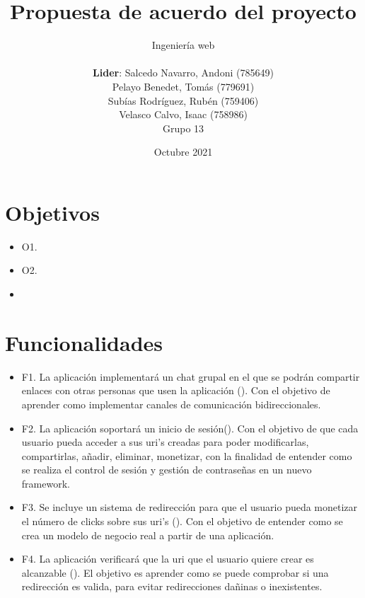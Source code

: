 \documentclass{article}
\title{Propuesta de acuerdo del proyecto}
\author{Ingeniería web\\\\\textbf{Lider}: Salcedo Navarro, Andoni (785649)\\Pelayo Benedet, Tomás (779691)\\Subías Rodríguez, Rubén (759406)\\Velasco Calvo, Isaac (758986)\\Grupo 13}
\date{Octubre 2021}
\begin{document}
 
\maketitle
 
\pagebreak
 
\section*{Objetivos}


\begin{itemize}
    \item O1.
    \item O2.
    \item 
\end{itemize}

\section*{Funcionalidades}



\begin{itemize}
    \item F1. La aplicación implementará un chat grupal en el que se podrán compartir enlaces con otras personas que usen la aplicación (). Con el objetivo de aprender como implementar canales de comunicación bidireccionales.
    \item F2. La aplicación soportará un inicio de sesión(). Con el objetivo de que cada usuario pueda acceder a sus uri's creadas para poder modificarlas, compartirlas, añadir, eliminar, monetizar, con la finalidad de entender como se realiza el control de sesión y gestión de contraseñas en un nuevo framework.
    \item F3. Se incluye un sistema de redirección para que el usuario pueda monetizar el número de clicks sobre sus uri's (). Con el objetivo de entender como se crea un modelo de negocio real a partir de una aplicación.
    \item F4. La aplicación verificará que la uri que el usuario quiere crear es alcanzable (). El objetivo es aprender como se puede comprobar si una redirección es valida, para evitar redirecciones dañinas o inexistentes.
\end{itemize}
\end{document}
